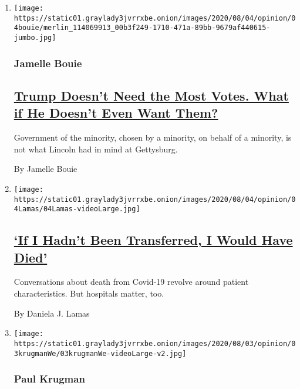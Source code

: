 \begin{enumerate}
\def\labelenumi{\arabic{enumi}.}
\item
  \texttt{[image: https://static01.graylady3jvrrxbe.onion/images/2020/08/04/opinion/04bouie/merlin\_114069913\_00b3f249-1710-471a-89bb-9679af440615-jumbo.jpg]}

  \hypertarget{jamelle-bouie}{%
  \subsubsection{Jamelle Bouie}\label{jamelle-bouie}}

  \hypertarget{trump-doesnt-need-the-most-votes-what-if-he-doesnt-even-want-them}{%
  \subsection{\texorpdfstring{\href{/2020/08/04/opinion/trump-2020-electoral-college.html}{Trump
  Doesn't Need the Most Votes. What if He Doesn't Even Want
  Them?}}{Trump Doesn't Need the Most Votes. What if He Doesn't Even Want Them?}}\label{trump-doesnt-need-the-most-votes-what-if-he-doesnt-even-want-them}}

  Government of the minority, chosen by a minority, on behalf of a
  minority, is not what Lincoln had in mind at Gettysburg.

  By Jamelle Bouie
\item
  \texttt{[image: https://static01.graylady3jvrrxbe.onion/images/2020/08/04/opinion/04Lamas/04Lamas-videoLarge.jpg]}

  \hypertarget{if-i-hadnt-been-transferred-i-would-have-died}{%
  \subsection{\texorpdfstring{\href{/2020/08/04/opinion/covid-rural-hospitals.html}{`If
  I Hadn't Been Transferred, I Would Have
  Died'}}{`If I Hadn't Been Transferred, I Would Have Died'}}\label{if-i-hadnt-been-transferred-i-would-have-died}}

  Conversations about death from Covid-19 revolve around patient
  characteristics. But hospitals matter, too.

  By Daniela J. Lamas
\item
  \texttt{[image: https://static01.graylady3jvrrxbe.onion/images/2020/08/03/opinion/03krugmanWe/03krugmanWe-videoLarge-v2.jpg]}

  \hypertarget{paul-krugman}{%
  \subsubsection{Paul Krugman}\label{paul-krugman}}


\end{enumerate}
